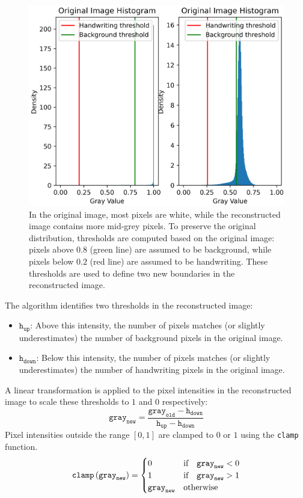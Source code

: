 \begin{toReview}
	\begin{figure}[H]
		\centering \includegraphics[width=0.8\linewidth]{Figures/fft_diagrams.png} \caption[Density changes after FFT compression]{In the original image, most pixels are white, while the reconstructed image contains more mid-grey pixels. To preserve the original distribution, thresholds are computed based on the original image: pixels above $0.8$ (green line) are assumed to be background, while pixels below $0.2$ (red line) are assumed to be handwriting. These thresholds are used to define two new boundaries in the reconstructed image.} \label{fig:fft_diagrams}
	\end{figure}

	\noindent The algorithm identifies two thresholds in the reconstructed image:
	\begin{itemize}
		\item $\texttt{h}_\texttt{up}$: Above this intensity, the number of pixels matches (or slightly underestimates) the number of background pixels in the original image.
		\item $\texttt{h}_\texttt{down}$: Below this intensity, the number of pixels matches (or slightly underestimates) the number of handwriting pixels in the original image.
	\end{itemize}
	\noindent A linear transformation is applied to the pixel intensities in the reconstructed image to scale these thresholds to $1$ and $0$ respectively:
	\[
	\texttt{gray}_\texttt{new} = \frac{\texttt{gray}_\texttt{old} - \texttt{h}_\texttt{down}}{\texttt{h}_\texttt{up} - \texttt{h}_\texttt{down}}
	\]
	\noindent Pixel intensities outside the range $[0,1]$ are clamped to $0$ or $1$ using the \texttt{clamp} function.
	\[
		\texttt{clamp}\left(\texttt{gray}_\texttt{new}\right) = \begin{cases}
			0 & \textnormal{if} \quad \texttt{gray}_\texttt{new} < 0 \\
			1 & \textnormal{if} \quad \texttt{gray}_\texttt{new} > 1 \\
			\texttt{gray}_\texttt{new} & \textnormal{otherwise}
		\end{cases}
	\]


\end{toReview}
